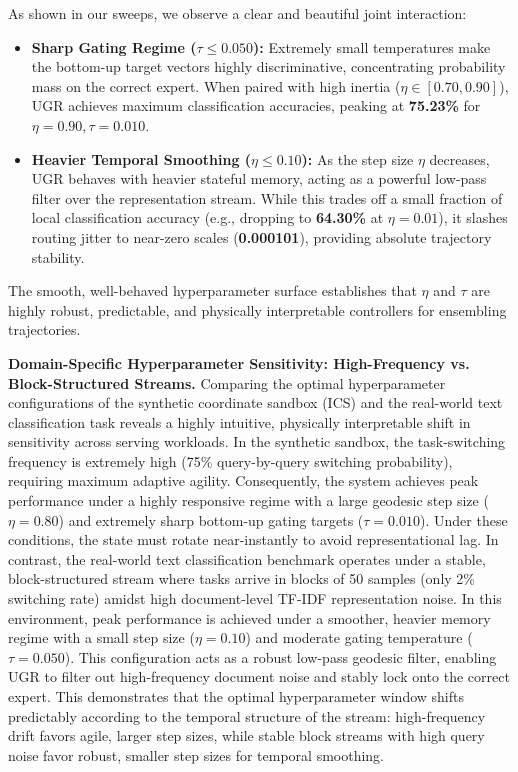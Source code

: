 As shown in our sweeps, we observe a clear and beautiful joint interaction:
\begin{itemize}
    \item \textbf{Sharp Gating Regime ($\tau \le 0.050$):} Extremely small temperatures make the bottom-up target vectors highly discriminative, concentrating probability mass on the correct expert. When paired with high inertia ($\eta \in [0.70, 0.90]$), UGR achieves maximum classification accuracies, peaking at \textbf{75.23\%} for $\eta = 0.90, \tau = 0.010$.
    \item \textbf{Heavier Temporal Smoothing ($\eta \le 0.10$):} As the step size $\eta$ decreases, UGR behaves with heavier stateful memory, acting as a powerful low-pass filter over the representation stream. While this trades off a small fraction of local classification accuracy (e.g., dropping to \textbf{64.30\%} at $\eta = 0.01$), it slashes routing jitter to near-zero scales (\textbf{0.000101}), providing absolute trajectory stability.
\end{itemize}
The smooth, well-behaved hyperparameter surface establishes that $\eta$ and $\tau$ are highly robust, predictable, and physically interpretable controllers for ensembling trajectories.

\textbf{Domain-Specific Hyperparameter Sensitivity: High-Frequency vs. Block-Structured Streams.}
Comparing the optimal hyperparameter configurations of the synthetic coordinate sandbox (ICS) and the real-world text classification task reveals a highly intuitive, physically interpretable shift in sensitivity across serving workloads. In the synthetic sandbox, the task-switching frequency is extremely high (75\% query-by-query switching probability), requiring maximum adaptive agility. Consequently, the system achieves peak performance under a highly responsive regime with a large geodesic step size ($\eta = 0.80$) and extremely sharp bottom-up gating targets ($\tau = 0.010$). Under these conditions, the state must rotate near-instantly to avoid representational lag. In contrast, the real-world text classification benchmark operates under a stable, block-structured stream where tasks arrive in blocks of 50 samples (only 2\% switching rate) amidst high document-level TF-IDF representation noise. In this environment, peak performance is achieved under a smoother, heavier memory regime with a small step size ($\eta = 0.10$) and moderate gating temperature ($\tau = 0.050$). This configuration acts as a robust low-pass geodesic filter, enabling UGR to filter out high-frequency document noise and stably lock onto the correct expert. This demonstrates that the optimal hyperparameter window shifts predictably according to the temporal structure of the stream: high-frequency drift favors agile, larger step sizes, while stable block streams with high query noise favor robust, smaller step sizes for temporal smoothing.


